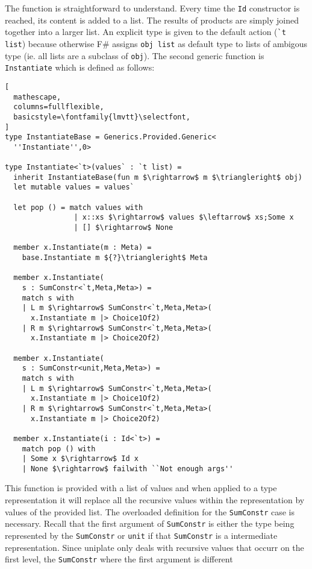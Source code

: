 \documentclass{sigplanconf}
\begin{document}
The function is straightforward to understand. Every time
the \verb+Id+ constructor is reached, its content is added
to a list. The results of products are simply joined
together into a larger list. An explicit type is given
to the default action (\verb+`t list+) because otherwise
F\# assigns \verb+obj list+ as default type to lists of
ambigous type (ie. all lists are a subclass of \verb+obj+).
The second generic function is \verb+Instantiate+ which is
defined as follows:
\begin{lstlisting}[
  mathescape,
  columns=fullflexible,
  basicstyle=\fontfamily{lmvtt}\selectfont,
]
type InstantiateBase = Generics.Provided.Generic<
  ''Instantiate'',0>

type Instantiate<`t>(values` : `t list) =
  inherit InstantiateBase(fun m $\rightarrow$ m $\triangleright$ obj)
  let mutable values = values`

  let pop () = match values with
                | x::xs $\rightarrow$ values $\leftarrow$ xs;Some x
                | [] $\rightarrow$ None

  member x.Instantiate(m : Meta) =
    base.Instantiate m ${?}\triangleright$ Meta

  member x.Instantiate(
    s : SumConstr<`t,Meta,Meta>) =
    match s with
    | L m $\rightarrow$ SumConstr<`t,Meta,Meta>(
      x.Instantiate m |> Choice1Of2)
    | R m $\rightarrow$ SumConstr<`t,Meta,Meta>(
      x.Instantiate m |> Choice2Of2)

  member x.Instantiate(
    s : SumConstr<unit,Meta,Meta>) =
    match s with
    | L m $\rightarrow$ SumConstr<`t,Meta,Meta>(
      x.Instantiate m |> Choice1Of2)
    | R m $\rightarrow$ SumConstr<`t,Meta,Meta>(
      x.Instantiate m |> Choice2Of2)

  member x.Instantiate(i : Id<`t>) =
    match pop () with
    | Some x $\rightarrow$ Id x
    | None $\rightarrow$ failwith ``Not enough args''

\end{lstlisting}
This function is provided with a list of values and
when applied to a type representation it will replace
all the recursive values within the representation
by values of the provided list. The overloaded
definition for the \verb+SumConstr+ case is necessary.
Recall that the first argument of \verb+SumConstr+ is either
the type being represented by the \verb+SumConstr+ or
\verb+unit+ if that \verb+SumConstr+ is a intermediate
representation. Since uniplate only deals with
recursive values that occurr on the first level,
the \verb+SumConstr+ where the first argument is different
\end{document}
